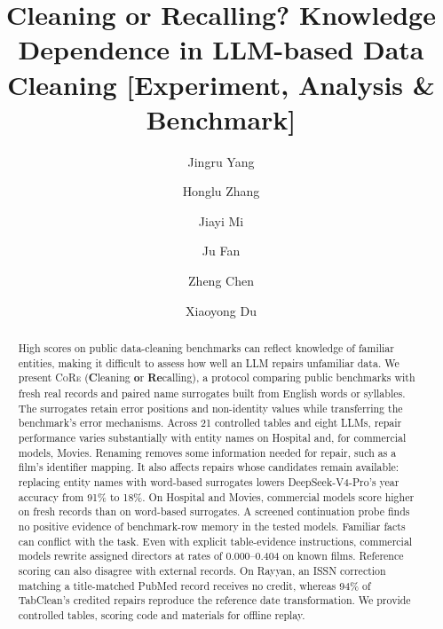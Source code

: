 \documentclass[sigconf, nonacm]{acmart}
\newcommand{\core}{\textsc{CoRe}}
\begin{document}
\title[Cleaning or Recalling? Knowledge Dependence in LLM-based Data Cleaning]{Cleaning or Recalling? Knowledge Dependence in LLM-based Data Cleaning [Experiment, Analysis \& Benchmark]}

\author{Jingru Yang}

\author{Honglu Zhang}

\author{Jiayi Mi}

\author{Ju Fan}

\author{Zheng Chen}

\author{Xiaoyong Du}


\begin{abstract}
High scores on public data-cleaning benchmarks can reflect knowledge of familiar entities,
making it difficult to assess how well an LLM repairs unfamiliar data. We present \core{}
(\textbf{C}leaning \textbf{o}r \textbf{Re}calling), a protocol comparing public benchmarks with fresh real records and paired
name surrogates built from English words or syllables. The surrogates retain error positions
and non-identity values while transferring the benchmark's error mechanisms. Across 21
controlled tables and eight LLMs, repair performance varies substantially with entity names
on Hospital and, for commercial models, Movies. Renaming removes some information needed
for repair, such as a film's identifier mapping. It also affects repairs whose candidates
remain available: replacing entity names with word-based surrogates lowers
DeepSeek-V4-Pro's year accuracy from 91\% to 18\%.
On Hospital and Movies, commercial models score higher on fresh records than on word-based
surrogates. A screened continuation probe finds no positive evidence of benchmark-row memory
in the tested models.
Familiar facts can conflict with the task. Even with explicit table-evidence instructions,
commercial models rewrite assigned directors at rates of 0.000--0.404 on known films.
Reference scoring can also disagree with external records. On Rayyan,
an ISSN correction matching a title-matched PubMed record
receives no credit, whereas 94\% of TabClean's credited repairs reproduce the reference date
transformation. We provide controlled tables, scoring code and materials for offline replay.
\end{abstract}
\end{document}
